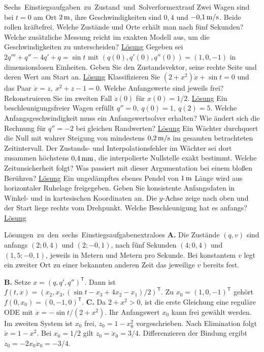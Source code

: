 \unit{Sechs Einstiegsaufgaben zu Zustand und Solverform}{extrauf}
Zwei Wagen sind bei \(t=0\) am Ort \(2\,\mathrm{m}\), ihre Geschwindigkeiten sind \(0{,}4\) und \(-0{,}1\,\mathrm{m/s}\). Beide rollen kräftefrei. Welche Zustände und Orte erhält man nach fünf Sekunden? Welche zusätzliche Messung reicht im exakten Modell aus, um die Geschwindigkeiten zu unterscheiden? \hyperlink{extraAB}{Lösung}
Gegeben sei \(2q'''+q''-4q'+q=\sin t\) mit \((q(0),q'(0),q''(0))=(1,0,-1)\) in dimensionslosen Einheiten. Geben Sie den Zustandsvektor, seine rechte Seite und deren Wert am Start an. \hyperlink{extraAB}{Lösung}
Klassifizieren Sie \((2+x^2)\dot x+\sin t=0\) und das Paar \(\dot x=z,\ x^2+z-1=0\). Welche Anfangswerte sind jeweils frei? Rekonstruieren Sie im zweiten Fall \(\dot z(0)\) für \(x(0)=1/2\). \hyperlink{extraCD}{Lösung}
Ein beschleunigungsfreier Wagen erfüllt \(q''=0,\ q(0)=1,\ q(2)=5\). Welche Anfangsgeschwindigkeit muss ein Anfangswertsolver erhalten? Wie ändert sich die Rechnung für \(q''=-2\) bei gleichen Randwerten? \hyperlink{extraCD}{Lösung}
Ein Wächter durchquert die Null mit wahrer Steigung von mindestens \(0{,}2\,\mathrm{m/s}\) im gesamten betrachteten Zeitintervall. Der Zustands- und Interpolationsfehler im Wächter sei dort zusammen höchstens \(0{,}4\,\mathrm{mm}\), die interpolierte Nullstelle exakt bestimmt. Welche Zeitunsicherheit folgt? Was passiert mit dieser Argumentation bei einem bloßen Berühren? \hyperlink{extraEF}{Lösung}
Ein ungedämpftes ebenes Pendel von \(1\,\mathrm{m}\) Länge wird aus horizontaler Ruhelage freigegeben. Geben Sie konsistente Anfangsdaten in Winkel- und in kartesischen Koordinaten an. Die \(y\)-Achse zeige nach oben und der Start liege rechts vom Drehpunkt. Welche Beschleunigung hat es anfangs? \hyperlink{extraEF}{Lösung}

\unit{Lösungen zu den sechs Einstiegsaufgaben}{extraloes}
\hypertarget{extraAB}{}
\textbf{A.} Die Zustände \((q,v)\) sind anfangs \((2;0{,}4)\) und \((2;-0{,}1)\), nach fünf Sekunden \((4;0{,}4)\) und \((1{,}5;-0{,}1)\), jeweils in Metern und Metern pro Sekunde. Bei konstantem \(v\) legt ein zweiter Ort zu einer bekannten anderen Zeit das jeweilige \(v\) bereits fest.

\textbf{B.} Setze \(x=(q,q',q'')^\mathsf T\). Dann ist \(f(t,x)=(x_2,x_3,(\sin t-x_3+4x_2-x_1)/2)^\mathsf T\). Zu \(x_0=(1,0,-1)^\mathsf T\) gehört \(f(0,x_0)=(0,-1,0)^\mathsf T\).
\hypertarget{extraCD}{}
\textbf{C.} Da \(2+x^2>0\), ist die erste Gleichung eine reguläre ODE mit \(\dot x=-\sin t/(2+x^2)\). Ihr Anfangswert \(x_0\) kann frei gewählt werden. Im zweiten System ist \(x_0\) frei, \(z_0=1-x_0^2\) vorgeschrieben. Nach Elimination folgt \(\dot x=1-x^2\). Bei \(x_0=1/2\) gilt \(z_0=\dot x_0=3/4\). Differenzieren der Bindung ergibt \(\dot z_0=-2x_0\dot x_0=-3/4\).

